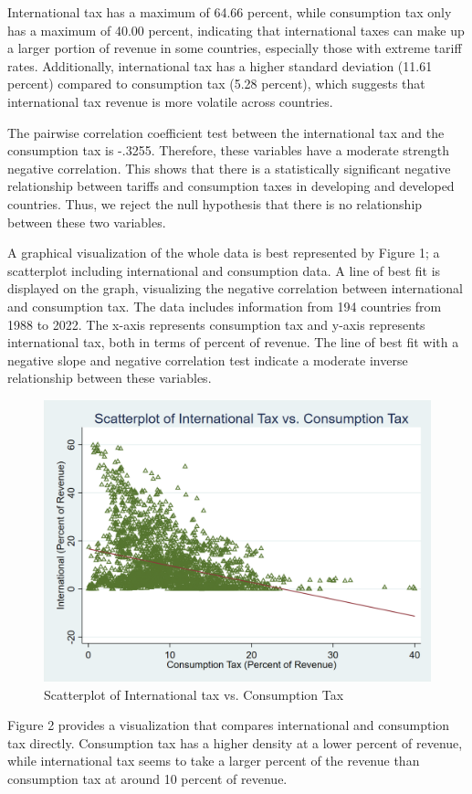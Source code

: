 \documentclass[12pt]{article}
\begin{document}
International tax has a maximum of 64.66 percent, while consumption tax only has a maximum of 40.00 percent, indicating that international taxes can make up a larger portion of revenue in some countries, especially those with extreme tariff rates. Additionally, international tax has a higher standard deviation (11.61 percent) compared to consumption tax (5.28 percent), which suggests that international tax revenue is more volatile across countries.

The pairwise correlation coefficient test between the international tax and the consumption tax is -.3255. Therefore, these variables have a moderate strength negative correlation. This shows that there is a statistically significant negative relationship between tariffs and consumption taxes in developing and developed countries. Thus, we reject the null hypothesis that there is no relationship between these two variables. 

A graphical visualization of the whole data is best represented by Figure 1; a scatterplot including international and consumption data. A line of best fit is displayed on the graph, visualizing the negative correlation between international and consumption tax. The data includes information from 194 countries from 1988 to 2022. The x-axis represents consumption tax and y-axis represents international tax, both in terms of percent of revenue. The line of best fit with a negative slope and negative correlation test indicate a moderate inverse relationship between these variables. 

\begin{figure}[h]
    \centering
    \includegraphics[width=0.5\linewidth]{Reproducibility_Package//png_files/Scatterplotintvscons.png}
    \caption{Scatterplot of International tax vs. Consumption Tax}
    \label{fig:enter-label}
\end{figure}

Figure 2 provides a visualization that compares international and consumption tax directly. Consumption tax has a higher density at a lower percent of revenue, while international tax seems to take a larger percent of the revenue than consumption tax at around 10 percent of revenue. 
\end{document}

